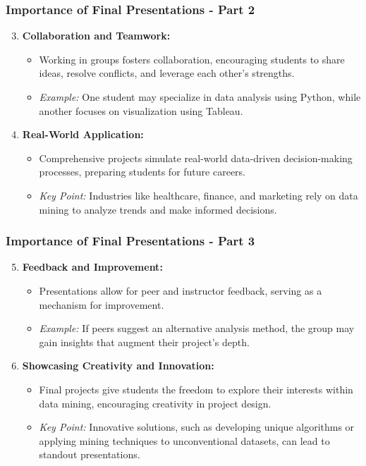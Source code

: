 \documentclass[aspectratio=169]{beamer}
\begin{document}
\begin{frame}[fragile]
    \frametitle{Importance of Final Presentations - Part 2}
    \begin{enumerate}
        \setcounter{enumi}{2} %
        \item \textbf{Collaboration and Teamwork:}
        \begin{itemize}
            \item Working in groups fosters collaboration, encouraging students to share ideas, resolve conflicts, and leverage each other’s strengths.
            \item \textit{Example:} One student may specialize in data analysis using Python, while another focuses on visualization using Tableau.
        \end{itemize}

        \item \textbf{Real-World Application:}
        \begin{itemize}
            \item Comprehensive projects simulate real-world data-driven decision-making processes, preparing students for future careers.
            \item \textit{Key Point:} Industries like healthcare, finance, and marketing rely on data mining to analyze trends and make informed decisions.
        \end{itemize}
    \end{enumerate}
\end{frame}

\begin{frame}[fragile]
    \frametitle{Importance of Final Presentations - Part 3}
    \begin{enumerate}
        \setcounter{enumi}{4} %
        \item \textbf{Feedback and Improvement:}
        \begin{itemize}
            \item Presentations allow for peer and instructor feedback, serving as a mechanism for improvement.
            \item \textit{Example:} If peers suggest an alternative analysis method, the group may gain insights that augment their project's depth.
        \end{itemize}

        \item \textbf{Showcasing Creativity and Innovation:}
        \begin{itemize}
            \item Final projects give students the freedom to explore their interests within data mining, encouraging creativity in project design.
            \item \textit{Key Point:} Innovative solutions, such as developing unique algorithms or applying mining techniques to unconventional datasets, can lead to standout presentations.
        \end{itemize}
    \end{enumerate}
\end{frame}
\end{document}
